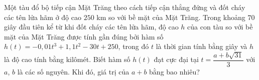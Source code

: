 \begin{bt}%
	Một tàu đổ bộ tiếp cận Mặt Trăng theo cách tiếp cận thẳng đứng và đốt cháy các tên lửa hãm ở độ cao $250$ km so với bề mặt của Mặt Trăng. Trong khoảng $70$ giây đầu tiên kể từ khi đốt cháy các tên lửa hãm, độ cao $h$ của con tàu so với bề mặt của Mặt Trăng được tính gần đúng bởi hàm số $h(t)=-0{,}01 t^3+1{,}1t^2-30t+250$, trong đó $t$ là thời gian tính bằng giây và $h$ là độ cao tính bằng kilômét. Biết hàm số $h(t)$ đạt cực đại tại $t=\dfrac{a+b\sqrt{31}}{3}$ với $a$, $b$ là các số nguyên. Khi đó, giá trị của $a+b$ bằng bao nhiêu?
\end{bt}

